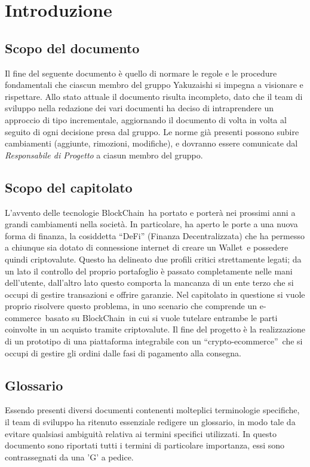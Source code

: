 \section{Introduzione}

\subsection {Scopo del documento}
Il fine del seguente documento è quello di normare le regole e le procedure fondamentali che ciascun membro del gruppo Yakuzaishi si impegna a visionare e rispettare.
Allo stato attuale il documento risulta incompleto, dato che il team di sviluppo nella redazione dei vari documenti ha deciso di intraprendere un approccio di tipo incrementale, aggiornando il documento di volta in volta al seguito di ogni decisione presa dal gruppo.
Le norme già presenti possono subire cambiamenti (aggiunte, rimozioni, modifiche), e dovranno essere comunicate dal \textit{Responsabile di Progetto} a ciasun membro del gruppo.

\subsection{Scopo del capitolato}
L'avvento delle tecnologie BlockChain\glo\ ha portato e porterà nei prossimi anni a grandi cambiamenti nella società. 
In particolare, ha aperto le porte a una nuova forma di finanza, la cosiddetta “DeFi” (Finanza Decentralizzata) che ha permesso a chiunque sia dotato di connessione internet di creare un Wallet\glo\ e possedere quindi criptovalute\glo.
Questo ha delineato due profili critici strettamente legati; da un lato il controllo del proprio portafoglio è passato completamente nelle mani dell'utente, dall'altro lato questo comporta la mancanza di un ente terzo che si occupi di gestire transazioni e offrire garanzie.
\newline
Nel capitolato in questione si vuole proprio risolvere questo problema, in uno scenario che comprende un e-commerce\glo\ basato su BlockChain\glo\ in cui si vuole tutelare entrambe le parti coinvolte in un acquisto tramite criptovalute.
\newline
Il fine del progetto è la realizzazione di un prototipo di una piattaforma integrabile con un “crypto-ecommerce”\glo\, che si occupi di gestire gli ordini dalle fasi di pagamento alla consegna.

\subsection{Glossario}
Essendo presenti diversi documenti contenenti molteplici terminologie specifiche, il team di sviluppo ha ritenuto essenziale redigere un glossario, in modo tale da evitare qualsiasi ambiguità relativa ai termini specifici utilizzati. 
In questo documento sono riportati tutti i termini di particolare importanza, essi sono contrassegnati da una 'G' a pedice.


